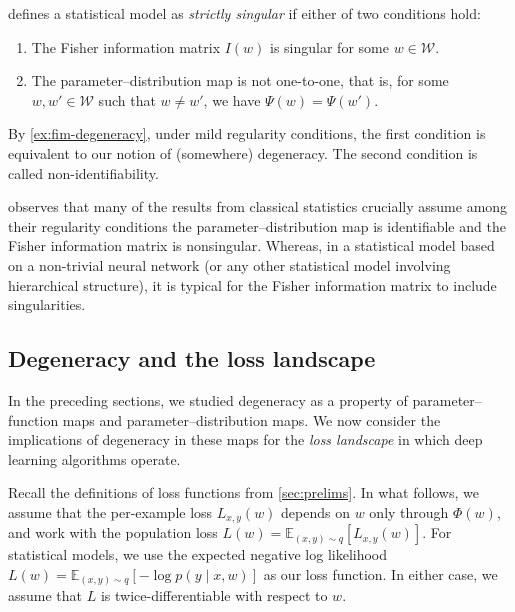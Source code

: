 \documentclass[11pt]{article}
\newcommand{\E}{\mathbb{E}}
\newcommand{\W}{\mathcal{W}}
\begin{document}
\begin{remark}
\label{rem:strictly-singular}
    \citet{Watanabe2009} defines a statistical model as \emph{strictly
    singular} if either of two conditions hold:
    \begin{enumerate}
        \item
            The Fisher information matrix $I(w)$ is singular for some $w \in \W$.
        \item
            The parameter--distribution map is not one-to-one, that is, for some $w, w' \in \W$ such that $w \neq w'$, we have $\Psi(w) = \Psi(w')$.
    \end{enumerate}
    By \cref{ex:fim-degeneracy}, under mild regularity conditions, the first
    condition is equivalent to our notion of (somewhere) degeneracy. The second
    condition is called non-identifiability.

    \citet{Watanabe2007,Watanabe2009} observes that many of the results from
    classical statistics crucially assume among their regularity conditions the
    parameter--distribution map is identifiable and the Fisher information
    matrix is nonsingular. Whereas, in a statistical model based on a
    non-trivial neural network (or any other statistical model involving
    hierarchical structure), it is typical for the Fisher information matrix to
    include singularities.
\end{remark}

\subsection{Degeneracy and the loss landscape}
\label{sec:degeneracy:hessian}

In the preceding sections, we studied degeneracy as a property of
parameter--function maps and parameter--distribution maps. We now consider the
implications of degeneracy in these maps for the \emph{loss landscape} in which
deep learning algorithms operate.

Recall the definitions of loss functions from \cref{sec:prelims}. In what
follows, we assume that the per-example loss $L_{x,y}(w)$ depends on $w$ only
through $\Phi(w)$, and work with the population loss
    $L(w) = \E_{(x,y) \sim q}[L_{x,y}(w)]$.
For statistical models,
we use the expected negative log likelihood
    $L(w) = \E_{(x,y) \sim q}[-\log p(y \mid x, w)]$
as our loss function. In either case, we assume that $L$ is
twice-differentiable with respect to $w$.
\end{document}
